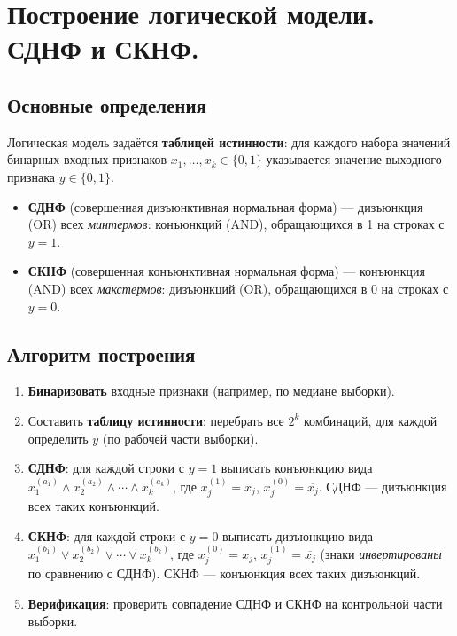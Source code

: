 \section{Построение логической модели. СДНФ и СКНФ.}

\subsection*{Основные определения}

Логическая модель задаётся \textbf{таблицей истинности}: для каждого набора значений бинарных входных признаков $x_1,\ldots,x_k \in \{0,1\}$ указывается значение выходного признака $y \in \{0,1\}$.

\begin{itemize}
  \item \textbf{СДНФ} (совершенная дизъюнктивная нормальная форма) — дизъюнкция (OR) всех \emph{минтермов}: конъюнкций (AND), обращающихся в 1 на строках с $y=1$.
  \item \textbf{СКНФ} (совершенная конъюнктивная нормальная форма) — конъюнкция (AND) всех \emph{макстермов}: дизъюнкций (OR), обращающихся в 0 на строках с $y=0$.
\end{itemize}

\subsection*{Алгоритм построения}

\begin{enumerate}
  \item \textbf{Бинаризовать} входные признаки (например, по медиане выборки).
  \item Составить \textbf{таблицу истинности}: перебрать все $2^k$ комбинаций, для каждой определить $y$ (по рабочей части выборки).
  \item \textbf{СДНФ}: для каждой строки с $y=1$ выписать конъюнкцию вида
    $x_1^{(a_1)} \land x_2^{(a_2)} \land \cdots \land x_k^{(a_k)}$,
    где $x_j^{(1)} = x_j$, $x_j^{(0)} = \overline{x_j}$.
    СДНФ — дизъюнкция всех таких конъюнкций.
  \item \textbf{СКНФ}: для каждой строки с $y=0$ выписать дизъюнкцию вида
    $x_1^{(b_1)} \lor x_2^{(b_2)} \lor \cdots \lor x_k^{(b_k)}$,
    где $x_j^{(0)} = x_j$, $x_j^{(1)} = \overline{x_j}$ (знаки \emph{инвертированы} по сравнению с СДНФ).
    СКНФ — конъюнкция всех таких дизъюнкций.
  \item \textbf{Верификация}: проверить совпадение СДНФ и СКНФ на контрольной части выборки.
\end{enumerate}

